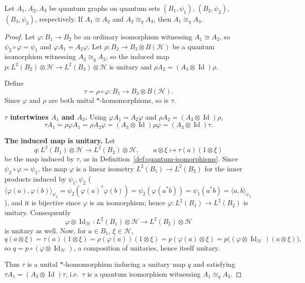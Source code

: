 \begin{proposition}
    \label{prop:quantum-iso-transitive-via-ordinary}
    Let \( A_1, A_2, A_3 \) be quantum graphs on quantum sets
    \( (B_1,\psi_1) \), \( (B_2,\psi_2) \), \( (B_3,\psi_3) \),
    respectively. If \( A_1 \cong A_2 \) and \( A_2 \cong_q A_3 \),
    then \( A_1 \cong_q A_3 \).
\end{proposition}

\begin{proof}
    Let \( \varphi \colon B_1 \to B_2 \) be an ordinary isomorphism
    witnessing \( A_1 \cong A_2 \), so \( \psi_2\circ\varphi = \psi_1 \)
    and \( \varphi A_1 = A_2 \varphi \). Let
    \( \rho \colon B_2 \to B_3 \otimes B(\mathcal{H}) \) be a quantum
    isomorphism witnessing \( A_2 \cong_q A_3 \), so the induced map
    \( p \colon L^2(B_2)\otimes\mathcal{H} \to L^2(B_3)\otimes\mathcal{H} \)
    is unitary and \( \rho A_2 = (A_3\otimes\operatorname{Id})\rho \).

    Define
    \[
        \tau = \rho \circ \varphi \colon B_1 \to B_3 \otimes B(\mathcal{H}).
    \]
    Since \( \varphi \) and \( \rho \) are both unital
    \( * \)-homomorphisms, so is \( \tau \).

    \textbf{\( \tau \) intertwines \( A_1 \) and \( A_3 \).} Using
    \( \varphi A_1 = A_2\varphi \) and \( \rho A_2 =
    (A_3\otimes\operatorname{Id})\rho \),
    \[
        \tau A_1 = \rho\varphi A_1 = \rho A_2 \varphi
        = (A_3\otimes\operatorname{Id})\rho\varphi =
        (A_3\otimes\operatorname{Id})\tau.
    \]

    \textbf{The induced map is unitary.} Let
    \[
        q \colon L^2(B_1)\otimes\mathcal{H} \to
        L^2(B_3)\otimes\mathcal{H}, \qquad
        a\otimes\xi \mapsto \tau(a)(1\otimes\xi)
    \]
    be the map induced by \( \tau \), as in
    Definition~\ref{def:quantum-isomorphisms}. Since
    \( \psi_2\circ\varphi = \psi_1 \), the map \( \varphi \) is a
    linear isometry \( L^2(B_1) \to L^2(B_2) \) for the inner products
    induced by \( \psi_1,\psi_2 \)
    (\( \langle \varphi(a),\varphi(b)\rangle_{\psi_2} =
            \psi_2(\varphi(a)^*\varphi(b))
    = \psi_2(\varphi(a^*b)) = \psi_1(a^*b) = \langle a,b\rangle_{\psi_1} \)),
    and it is bijective since \( \varphi \) is an isomorphism; hence
    \( \varphi \colon L^2(B_1) \to L^2(B_2) \) is unitary. Consequently
    \[
        \varphi\otimes\operatorname{Id}_{\mathcal{H}} \colon
        L^2(B_1)\otimes\mathcal{H} \to L^2(B_2)\otimes\mathcal{H}
    \]
    is unitary as well. Now, for \( a\in B_1 \), \( \xi\in\mathcal{H} \),
    \[
        q(a\otimes\xi) = \tau(a)(1\otimes\xi) = \rho(\varphi(a))(1\otimes\xi)
        = p(\varphi(a)\otimes\xi) =
        p\big((\varphi\otimes\operatorname{Id}_{\mathcal{H}})(a\otimes\xi)\big),
    \]
    so \( q = p \circ (\varphi\otimes\operatorname{Id}_{\mathcal{H}}) \), a
    composition of unitaries, hence itself unitary.

    Thus \( \tau \) is a unital \( * \)-homomorphism inducing a unitary
    map \( q \) and satisfying \( \tau A_1 =
    (A_3\otimes\operatorname{Id})\tau \),
    i.e.\ \( \tau \) is a quantum isomorphism witnessing
    \( A_1 \cong_q A_3 \).
\end{proof}

